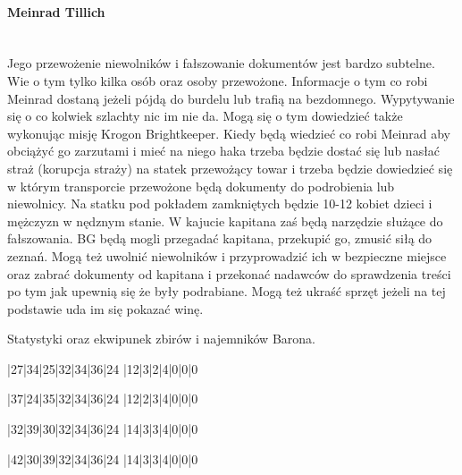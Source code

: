 \documentclass{article}
\begin{document}
\paragraph{Meinrad Tillich}\mbox{}\\\indent
Jego przewożenie niewolników i fałszowanie dokumentów jest bardzo subtelne. Wie o tym tylko kilka osób oraz osoby przewożone. Informacje o tym co robi Meinrad dostaną jeżeli pójdą do burdelu lub trafią na bezdomnego. Wypytywanie się o co kolwiek szlachty nic im nie da. Mogą się o tym dowiedzieć także wykonując misję Krogon Brightkeeper. Kiedy będą wiedzieć co robi Meinrad aby obciążyć go zarzutami i mieć na niego haka trzeba będzie dostać się lub nasłać straż (korupcja straży) na statek przewożący towar i trzeba będzie dowiedzieć się w którym transporcie przewożone będą dokumenty do podrobienia lub niewolnicy. Na statku pod pokładem zamkniętych będzie 10-12 kobiet dzieci i mężczyzn w nędznym stanie. W kajucie kapitana zaś będą narzędzie służące do fałszowania. BG będą mogli przegadać kapitana, przekupić go, zmusić siłą do zeznań. Mogą też uwolnić niewolników i przyprowadzić ich w bezpieczne miejsce oraz zabrać dokumenty od kapitana i przekonać nadawców do sprawdzenia treści po tym jak upewnią się że były podrabiane. Mogą też ukraść sprzęt jeżeli na tej podstawie uda im się pokazać winę.







\pagebreak
\centering
{}
Statystyki oraz ekwipunek zbirów i najemników Barona.
\raggedright

\startwhtable[Zbir]
|27|34|25|32|34|36|24
|12|3|2|4|0|0|0
\stopwhtable

\startwhtable[Zbir 2]
|37|24|35|32|34|36|24
|12|2|3|4|0|0|0
\stopwhtable

\startwhtable[Zbir 3]
|32|39|30|32|34|36|24
|14|3|3|4|0|0|0
\stopwhtable

\startwhtable[Zbir 4]
|42|30|39|32|34|36|24
|14|3|3|4|0|0|0
\stopwhtable
\end{document}
